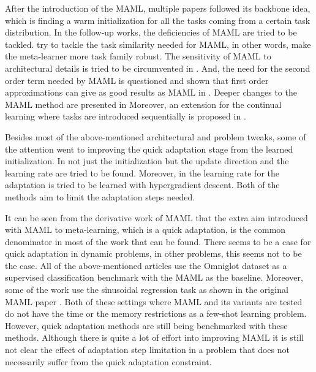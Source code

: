After the introduction of the MAML, multiple papers followed its backbone idea, which is finding a warm initialization for all the tasks coming from a certain task distribution. In the follow-up works, the deficiencies of MAML are tried to be tackled. \cite{flennerhag2019,collins2020} try to tackle the task similarity needed for MAML, in other words, make the meta-learner more task family robust. The sensitivity of MAML to architectural details is tried to be circumvented in \cite{antoniou2019}. And, the need for the second order term needed by MAML is questioned and shown that first order approximations can give as good results as MAML in \cite{nichol2018}. Deeper changes to the MAML method are presented in \cite{grant2018} Moreover, an extension for the continual learning where tasks are introduced sequentially is proposed in \cite{finn2019,rajasegaran2020}. 

Besides most of the above-mentioned architectural and problem tweaks, some of the attention went to improving the quick adaptation stage from the learned initialization. In \cite{li2017} not just the initialization but the update direction and the learning rate are tried to be found. Moreover, in \cite{behl2019} the learning rate for the adaptation is tried to be learned with hypergradient descent. Both of the methods aim to limit the adaptation steps needed. 

It can be seen from the derivative work of MAML that the extra aim introduced with MAML to meta-learning, which is a quick adaptation, is the common denominator in most of the work that can be found. There seems to be a case for quick adaptation in dynamic problems, in other problems, this seems not to be the case. All of the above-mentioned articles use the Omniglot dataset \cite{lake2019} as a supervised classification benchmark with the MAML as the baseline. Moreover, some of the work use the sinusoidal regression task as shown in the original MAML paper \cite{finn2017}. Both of these settings where MAML and its variants are tested do not have the time or the memory restrictions as a few-shot learning problem. However, quick adaptation methods are still being benchmarked with these methods. Although there is quite a lot of effort into improving MAML it is still not clear the effect of adaptation step limitation in a problem that does not necessarily suffer from the quick adaptation constraint.


